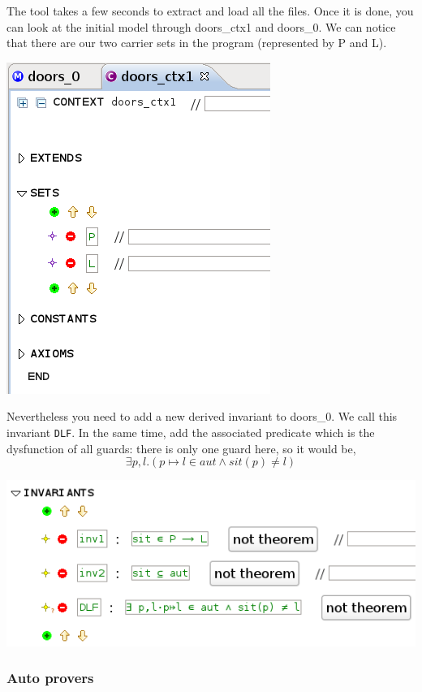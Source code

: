 The tool takes a few seconds to extract and load all the files. Once it is done, you can look at the initial model through doors\_ctx1 and doors\_0.
We can notice that there are our two carrier sets in the program (represented by P and L).
\begin{center}
	\includegraphics[]{img/tutorial/tut_10_carrier-sets.png}
\end{center}

Nevertheless you need to add a new derived invariant to doors\_0. We call this invariant \texttt{DLF}.
In the same time, add the associated predicate which is the dysfunction of all guards: there is only one guard here, so it would be,
\[
\exists p,l.(p \longmapsto l \in aut \land sit(p) \neq l )
\]



\begin{center}
	\includegraphics[]{img/tutorial/tut_10_new-invariant.png}
\end{center}

\subsubsection{Auto provers}


